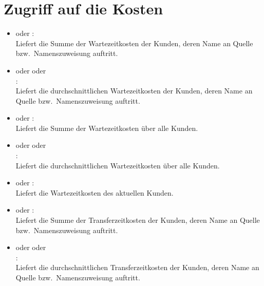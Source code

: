 \section{Zugriff auf die Kosten}

\begin{itemize}

\item
{} oder :\\
Liefert die Summe der Wartezeitkosten der Kunden, deren Name an Quelle bzw.\ Namenszuweisung  auftritt.  

\item
{} oder  oder\\
:\\
Liefert die durchschnittlichen Wartezeitkosten der Kunden, deren Name an Quelle bzw.\ Namenszuweisung  auftritt.

\item
{} oder :\\
Liefert die Summe der Wartezeitkosten über alle Kunden.

\item
{} oder  oder\\
:\\
Liefert die durchschnittlichen Wartezeitkosten über alle Kunden.

\item
{} oder :\\
Liefert die Wartezeitkosten des aktuellen Kunden.

\item
{} oder :\\
Liefert die Summe der Transferzeitkosten der Kunden, deren Name an Quelle bzw.\ Namenszuweisung  auftritt.

\item
{} oder  oder\\
:\\
Liefert die durchschnittlichen Transferzeitkosten der Kunden, deren Name an Quelle bzw.\ Namenszuweisung  auftritt.


\end{itemize}
